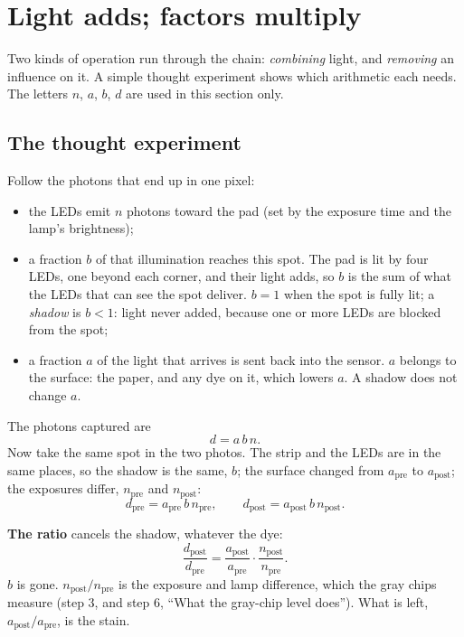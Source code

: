 \documentclass[11pt,letter]{article}
\begin{document}
\section{Light adds; factors multiply}
\label{sec:rules}

Two kinds of operation run through the chain: \emph{combining} light, and
\emph{removing} an influence on it.  A simple thought experiment shows which
arithmetic each needs.  The letters $n$, $a$, $b$, $d$ are used in this
section only.

\subsection{The thought experiment}

Follow the photons that end up in one pixel:
\begin{itemize}[nosep]
  \item the LEDs emit $n$ photons toward the pad (set by the exposure time
    and the lamp's brightness);
  \item a fraction $b$ of that illumination reaches this spot.  The pad is
    lit by four LEDs, one beyond each corner, and their light adds, so $b$
    is the sum of what the LEDs that can see the spot deliver.  $b = 1$ when
    the spot is fully lit; a \emph{shadow} is $b < 1$: light never added,
    because one or more LEDs are blocked from the spot;
  \item a fraction $a$ of the light that arrives is sent back into the
    sensor.  $a$ belongs to the surface: the paper, and any dye on it, which
    lowers $a$.  A shadow does not change $a$.
\end{itemize}
The photons captured are
\begin{equation}
  d = a\, b\, n .
\end{equation}
Now take the same spot in the two photos.  The strip and the LEDs are in
the same places, so the shadow is the same, $b$; the surface changed from
$a_\text{pre}$ to $a_\text{post}$; the exposures differ, $n_\text{pre}$
and $n_\text{post}$:
\begin{equation}
  d_\text{pre} = a_\text{pre}\, b\, n_\text{pre}, \qquad
  d_\text{post} = a_\text{post}\, b\, n_\text{post}.
\end{equation}

\noindent\textbf{The ratio} cancels the shadow, whatever the dye:
\begin{equation}
  \frac{d_\text{post}}{d_\text{pre}}
  = \frac{a_\text{post}}{a_\text{pre}} \cdot
    \frac{n_\text{post}}{n_\text{pre}} .
\end{equation}
$b$ is gone.  $n_\text{post}/n_\text{pre}$ is the exposure and lamp
difference, which the gray chips measure (step 3, and step 6, ``What the
gray-chip level does'').  What is left, $a_\text{post}/a_\text{pre}$, is the
stain.
\end{document}
